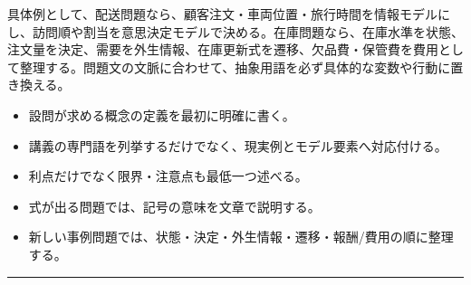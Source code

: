 具体例として、配送問題なら、顧客注文・車両位置・旅行時間を情報モデルにし、訪問順や割当を意思決定モデルで決める。在庫問題なら、在庫水準を状態、注文量を決定、需要を外生情報、在庫更新式を遷移、欠品費・保管費を費用として整理する。問題文の文脈に合わせて、抽象用語を必ず具体的な変数や行動に置き換える。\par
{}
\begin{itemize}
\item 設問が求める概念の定義を最初に明確に書く。
\item 講義の専門語を列挙するだけでなく、現実例とモデル要素へ対応付ける。
\item 利点だけでなく限界・注意点も最低一つ述べる。
\item 式が出る問題では、記号の意味を文章で説明する。
\item 新しい事例問題では、状態・決定・外生情報・遷移・報酬/費用の順に整理する。
\end{itemize}
\vspace{2mm}\hrule\vspace{2mm}